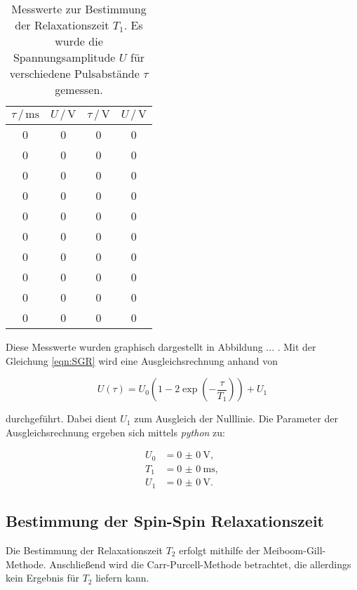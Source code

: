 \begin{table}
  \centering
  \caption{Messwerte zur Bestimmung der Relaxationszeit $T_1$. Es wurde die Spannungsamplitude $U$ für verschiedene Pulsabstände $\tau$ gemessen.}
  \label{tab:mess1}
  \begin{tabular}{c c c c}
  \toprule
  $\tau \,/\, \si{\milli\second}$ & $U \,/\, \si{\volt}$ & $\tau \,/\, \si{\volt}$
  & $U \,/\, \si{\volt}$\\
  \midrule 
      0 & 0 & 0 & 0\\
      0 & 0 & 0 & 0\\
      0 & 0 & 0 & 0\\
      0 & 0 & 0 & 0\\
      0 & 0 & 0 & 0\\
      0 & 0 & 0 & 0\\
      0 & 0 & 0 & 0\\
      0 & 0 & 0 & 0\\
      0 & 0 & 0 & 0\\
      0 & 0 & 0 & 0\\
  \bottomrule
  \end{tabular}
\end{table}

Diese Messwerte wurden graphisch dargestellt in Abbildung ... . Mit der Gleichung \eqref{eqn:SGR} wird eine Ausgleichsrechnung
anhand von 

\begin{equation*}
  U\left(\tau\right) = U_0 \left(1-2\exp{\left(-\frac{\tau}{T_1}\right)}\right) + U_1
\end{equation*}

durchgeführt. Dabei dient $U_1$ zum Ausgleich der Nulllinie. 
Die Parameter der Ausgleichsrechnung ergeben sich mittels \textit{python} zu:

\begin{align}
  U_0 &= \SI{0(0)}{\volt},\\
  T_1 &= \SI{0(0)}{\milli\second},\\
  U_1 &= \SI{0(0)}{\volt}.
\end{align}

\subsection{Bestimmung der Spin-Spin Relaxationszeit}

Die Bestimmung der Relaxationszeit $T_2$ erfolgt mithilfe der Meiboom-Gill-Methode. Anschließend wird die Carr-Purcell-Methode 
betrachtet, die allerdings kein Ergebnis für $T_2$ liefern kann.

